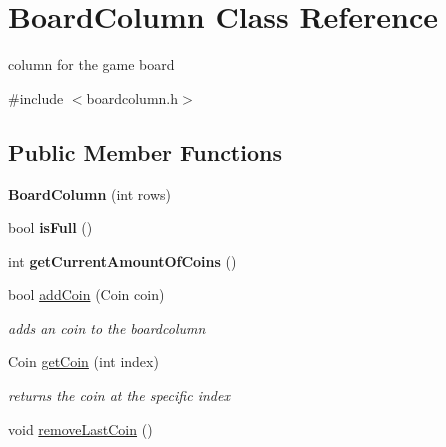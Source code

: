 \hypertarget{classBoardColumn}{\section{\-Board\-Column \-Class \-Reference}
\label{classBoardColumn}
}


column for the game board  




{\ttfamily \#include $<$boardcolumn.\-h$>$}

\subsection*{\-Public \-Member \-Functions}
\begin{DoxyCompactItemize}
\item 
\hypertarget{classBoardColumn_a8f088cd71325ffbdc839c101ca6a4fda}{{\bfseries \-Board\-Column} (int rows)}\label{classBoardColumn_a8f088cd71325ffbdc839c101ca6a4fda}

\item 
\hypertarget{classBoardColumn_adb1521008180835bd37572a1cda02ef8}{bool {\bfseries is\-Full} ()}\label{classBoardColumn_adb1521008180835bd37572a1cda02ef8}

\item 
\hypertarget{classBoardColumn_a09589c8bd6912dab8a7fb27500002553}{int {\bfseries get\-Current\-Amount\-Of\-Coins} ()}\label{classBoardColumn_a09589c8bd6912dab8a7fb27500002553}

\item 
\hypertarget{classBoardColumn_a060fd86473c5df6a98449e317bc2a364}{bool \hyperlink{classBoardColumn_a060fd86473c5df6a98449e317bc2a364}{add\-Coin} (\-Coin coin)}\label{classBoardColumn_a060fd86473c5df6a98449e317bc2a364}

\begin{DoxyCompactList}\small\item\em adds an coin to the boardcolumn \end{DoxyCompactList}\item 
\-Coin \hyperlink{classBoardColumn_a8b8107a2cb462ffd73d484b6e1d9b359}{get\-Coin} (int index)
\begin{DoxyCompactList}\small\item\em returns the coin at the specific index \end{DoxyCompactList}\item 
\hypertarget{classBoardColumn_ad4b43af3abf8de3332378529b7d5e743}{void \hyperlink{classBoardColumn_ad4b43af3abf8de3332378529b7d5e743}{remove\-Last\-Coin} ()}\label{classBoardColumn_ad4b43af3abf8de3332378529b7d5e743}


\end{DoxyCompactItemize}
